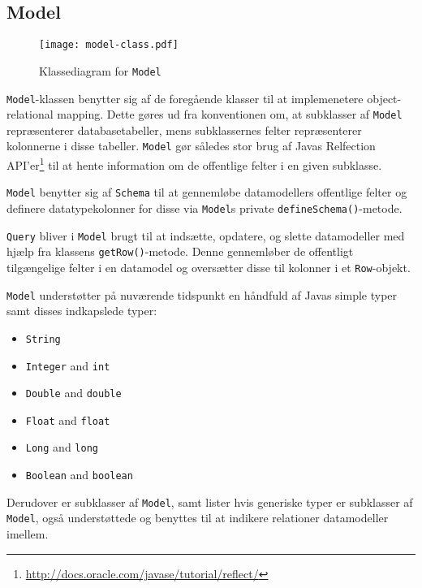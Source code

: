 \subsection{Model}

\begin{wrapfigure}{r}{0.35\textwidth}
  \centering
  \texttt{[image: model-class.pdf]}
  \caption{Klassediagram for \texttt{Model}}
  \label{class-diagram:model}
\end{wrapfigure}

\texttt{Model}-klassen benytter sig af de foregående klasser til at implemenetere object-relational mapping. Dette gøres ud fra konventionen om, at subklasser af \texttt{Model} repræsenterer databasetabeller, mens subklassernes felter repræsenterer kolonnerne i disse tabeller. \texttt{Model} gør således stor brug af Javas Relfection API'er\footnote{\url{http://docs.oracle.com/javase/tutorial/reflect/}} til at hente information om de offentlige felter i en given subklasse.

\texttt{Model} benytter sig af \texttt{Schema} til at gennemløbe datamodellers offentlige felter og definere datatypekolonner for disse via \texttt{Model}s private \texttt{defineSchema()}-metode.

\texttt{Query} bliver i \texttt{Model} brugt til at indsætte, opdatere, og slette datamodeller med hjælp fra klassens \texttt{getRow()}-metode. Denne gennemløber de offentligt tilgængelige felter i en datamodel og oversætter disse til kolonner i et \texttt{Row}-objekt.

\texttt{Model} understøtter på nuværende tidspunkt en håndfuld af Javas simple typer samt disses indkapslede typer:

\begin{multicols}{3}
\begin{itemize}
  \item \texttt{String}
  \item \texttt{Integer} and \texttt{int}
  \item \texttt{Double} and \texttt{double}
  \item \texttt{Float} and \texttt{float}
  \item \texttt{Long} and \texttt{long}
  \item \texttt{Boolean} and \texttt{boolean}
\end{itemize}
\end{multicols}

Derudover er subklasser af \texttt{Model}, samt lister hvis generiske typer er subklasser af \texttt{Model}, også understøttede og benyttes til at indikere relationer datamodeller imellem.

